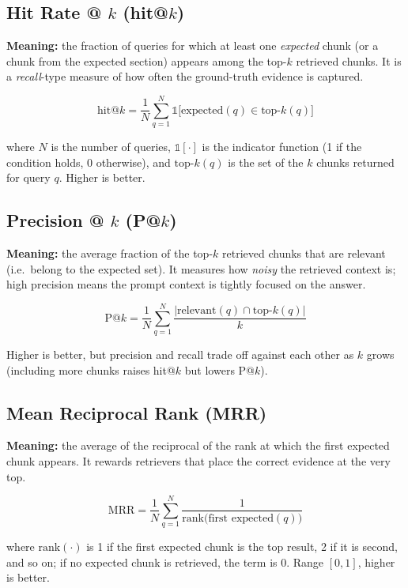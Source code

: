 \documentclass[11pt,a4paper]{article}
\begin{document}
\subsection{Hit Rate @ $k$ (hit@$k$)}

\textbf{Meaning:} the fraction of queries for which at least one \emph{expected} chunk
(or a chunk from the expected section) appears among the top-$k$ retrieved chunks. It is
a \emph{recall}-type measure of how often the ground-truth evidence is captured.

\[
\text{hit@}k = \frac{1}{N}\sum_{q=1}^{N} \mathbb{1}\big[\text{expected}(q) \in \text{top-}k(q)\big]
\]

where $N$ is the number of queries, $\mathbb{1}[\cdot]$ is the indicator function (1 if
the condition holds, 0 otherwise), and $\text{top-}k(q)$ is the set of the $k$ chunks
returned for query $q$. Higher is better.

\subsection{Precision @ $k$ (P@$k$)}

\textbf{Meaning:} the average fraction of the top-$k$ retrieved chunks that are relevant
(i.e.\ belong to the expected set). It measures how \emph{noisy} the retrieved context is;
high precision means the prompt context is tightly focused on the answer.

\[
\text{P@}k = \frac{1}{N}\sum_{q=1}^{N} \frac{\big|\text{relevant}(q) \cap \text{top-}k(q)\big|}{k}
\]

Higher is better, but precision and recall trade off against each other as $k$ grows
(including more chunks raises hit@$k$ but lowers P@$k$).

\subsection{Mean Reciprocal Rank (MRR)}

\textbf{Meaning:} the average of the reciprocal of the rank at which the first expected
chunk appears. It rewards retrievers that place the correct evidence at the very top.

\[
\text{MRR} = \frac{1}{N}\sum_{q=1}^{N} \frac{1}{\text{rank}\big(\text{first expected}(q)\big)}
\]

where $\text{rank}(\cdot)$ is 1 if the first expected chunk is the top result, 2 if it is
second, and so on; if no expected chunk is retrieved, the term is 0. Range $[0, 1]$,
higher is better.
\end{document}
